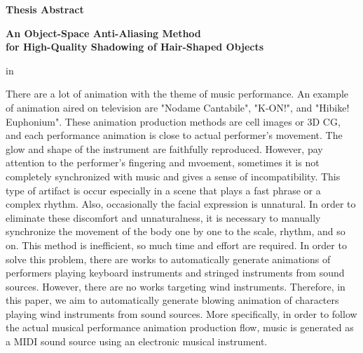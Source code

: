 \begin{center}
{\bf {\large Thesis Abstract}}

\vspace{2ex}

{\bf {\large An Object-Space Anti-Aliasing Method\\for High-Quality Shadowing of Hair-Shaped Objects}}
\end{center}

\vspace{3ex}

 in

There are a lot of animation with the theme of music performance.
%
An example of animation aired on television are "Nodame Cantabile", "K-ON!", and "Hibike! Euphonium".
%
These animation production methods are cell images or 3D CG, and each performance animation is close to actual performer's movement.
%
The glow and shape of the instrument are faithfully reproduced.
%
However, pay attention to the performer's fingering and mvoement, 
sometimes it is not completely synchronized with music and gives a sense of incompatibility.
%
This type of artifact is occur especially in a scene that plays a fast phrase or a complex rhythm.
%
Also, occasionally the facial expression is unnatural.
%
In order to eliminate these discomfort and unnaturalness, 
it is necessary to manually synchronize the movement of the body one by one to the scale, rhythm, and so on.
%
This method is inefficient, so much time and effort are required.
%
In order to solve this problem, there are works to automatically generate animations of performers playing keyboard instruments and stringed instruments from sound sources.
%
However, there are no works targeting wind instruments.
%
Therefore, in this paper, we aim to automatically generate blowing animation of characters playing wind instruments from sound sources.
%
More specifically, in order to follow the actual musical performance animation production flow, music is generated as a MIDI sound source using an electronic musical instrument.
%
%
%
%
%
%




